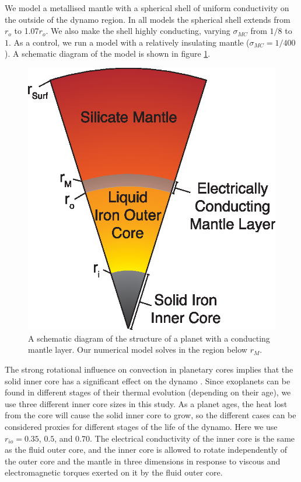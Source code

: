 We model a metallised mantle with a spherical shell of uniform conductivity on the outside of the dynamo region. In all models the spherical shell extends from $r_{o}$ to 1.07$r_{o}$. We also make the shell highly conducting, varying $\sigma_{MC}$ from $1/8$ to $1$. As a control, we run a model with a relatively insulating mantle ($\sigma_{MC}=1/400$). A schematic diagram of the model is shown in figure \ref{fig:structure}.
\begin{figure}
\centering
\noindent\includegraphics[width=.6\linewidth]{Chapter3/Figures/f1.eps}
\caption{A schematic diagram of the structure of a planet with a conducting mantle layer. Our numerical model solves in the region below $r_{M}$.}
\label{fig:structure}
\end{figure}

The strong rotational influence on convection in planetary cores implies that the solid inner core has a significant effect on the dynamo \citep{heimpelandaurnou2005, stanleyfluxspot}. Since exoplanets can be found in  different stages of their thermal evolution (depending on their age), we use three different inner core sizes in this study. As a planet ages, the heat lost from the core will cause the solid inner core to grow, so the different cases can be considered proxies for different stages of the life of the dynamo. Here we use $r_{io}=0.35$, $0.5$, and $0.70$. The electrical conductivity of the inner core is the same as the fluid outer core, and the inner core is allowed to rotate independently of the outer core and the mantle in three dimensions in response to viscous and electromagnetic torques exerted on it by the fluid outer core.

